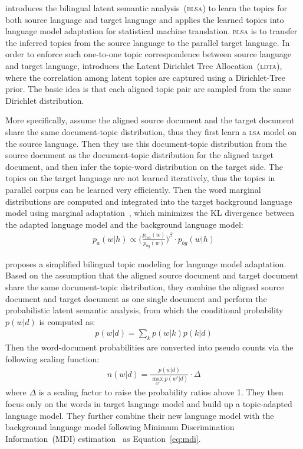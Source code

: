 \cite{Tam-2007} introduces the bilingual latent semantic analysis~(\textsc{blsa}) to learn the topics for both source language and target language and applies the learned topics into language model adaptation for statistical machine translation. \textsc{blsa} is to transfer the inferred topics from the source language to the parallel target language. In order to enforce such one-to-one topic correspondence between source language and target language, \cite{Tam-2007} introduces the Latent Dirichlet Tree Allocation~(\textsc{ldta}), where the correlation among latent topics are captured using a Dirichlet-Tree prior. The basic idea is that each aligned topic pair are sampled from the same Dirichlet distribution.

More specifically, \cite{Tam-2007} assume the aligned source document and the target document share the same document-topic distribution, thus they first learn a \textsc{lsa} model on the source language. Then they use this document-topic distribution from the source document as the document-topic distribution for the aligned target document, and then infer the topic-word distribution on the target side. The topics on the target language are not learned iteratively, thus the topics in parallel corpus can be learned very efficiently. Then the word marginal distributions are computed and integrated into the target background language model using marginal adaptation~\citep{Kneser-1997b}, which minimizes the KL divergence between the adapted language model and the background language model:
\begin{align}
\label{eq:mdi}
p_a(w|h) \propto \Big( \frac{p_{lsa}(w)}{p_{bg}(w)} \Big) ^{\beta} \cdot p_{bg}(w|h)
\end{align}

\cite{Ruiz-2011} proposes a simplified bilingual topic modeling for language model adaptation. Based on the assumption that the aligned source document and target document share the same document-topic distribution, they combine the aligned source document and target document as one single document and perform the probabilistic latent semantic analysis, from which the conditional probability $p(w|d)$ is computed as:
\begin{align}
p(w|d) = \sum_k p(w|k) p(k|d)
\end{align}
Then the word-document probabilities are converted into pseudo counts via the following scaling function:
\begin{align}
n(w|d) = \frac{p(w|d)}{\max_{w'} p(w'|d)} \cdot \Delta
\end{align}
where $\Delta$ is a scaling factor to raise the probability ratios above 1. They then focus only on the words in target language model and build up a topic-adapted language model. They further combine their new language model with the background language model following Minimum Discrimination Information~(\textsc{MDI}) estimation~\cite{Kneser-1997b} as Equation~\ref{eq:mdi}.

